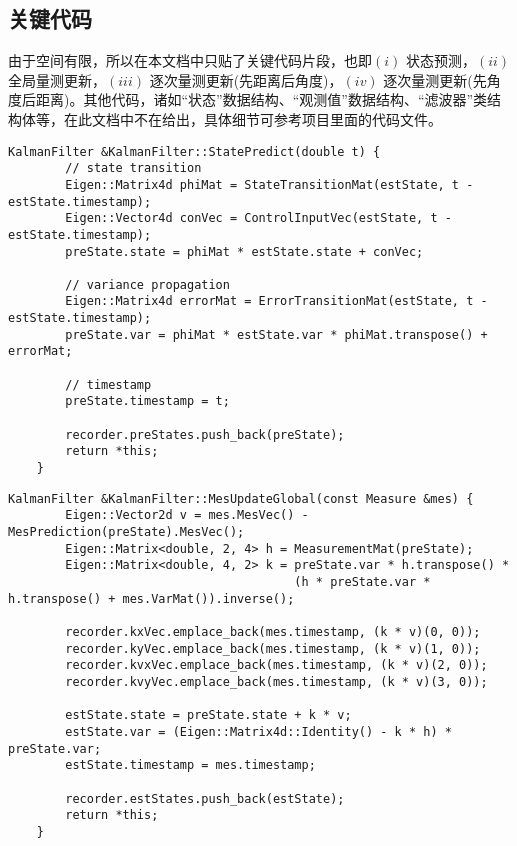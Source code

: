 \documentclass[12pt, onecolumn]{article}
\newcommand\normf{\fangsong}
\begin{document}
	\subsection{\normf 关键代码}
	由于空间有限，所以在本文档中只贴了关键代码片段，也即$(i)$ 状态预测，$(ii)$ 全局量测更新，$(iii)$ 逐次量测更新(先距离后角度)，$(iv)$ 逐次量测更新(先角度后距离)。其他代码，诸如“状态”数据结构、“观测值”数据结构、“滤波器”类结构体等，在此文档中不在给出，具体细节可参考项目里面的代码文件。
	\begin{lstlisting}[caption={\normf “状态预测”算法实现}]
    KalmanFilter &KalmanFilter::StatePredict(double t) {
        // state transition
        Eigen::Matrix4d phiMat = StateTransitionMat(estState, t - estState.timestamp);
        Eigen::Vector4d conVec = ControlInputVec(estState, t - estState.timestamp);
        preState.state = phiMat * estState.state + conVec;

        // variance propagation
        Eigen::Matrix4d errorMat = ErrorTransitionMat(estState, t - estState.timestamp);
        preState.var = phiMat * estState.var * phiMat.transpose() + errorMat;

        // timestamp
        preState.timestamp = t;

        recorder.preStates.push_back(preState);
        return *this;
    }
	\end{lstlisting}
		
	\begin{lstlisting}[caption={\normf “全局量测更新”算法实现}]
    KalmanFilter &KalmanFilter::MesUpdateGlobal(const Measure &mes) {
        Eigen::Vector2d v = mes.MesVec() - MesPrediction(preState).MesVec();
        Eigen::Matrix<double, 2, 4> h = MeasurementMat(preState);
        Eigen::Matrix<double, 4, 2> k = preState.var * h.transpose() *
                                        (h * preState.var * h.transpose() + mes.VarMat()).inverse();

        recorder.kxVec.emplace_back(mes.timestamp, (k * v)(0, 0));
        recorder.kyVec.emplace_back(mes.timestamp, (k * v)(1, 0));
        recorder.kvxVec.emplace_back(mes.timestamp, (k * v)(2, 0));
        recorder.kvyVec.emplace_back(mes.timestamp, (k * v)(3, 0));

        estState.state = preState.state + k * v;
        estState.var = (Eigen::Matrix4d::Identity() - k * h) * preState.var;
        estState.timestamp = mes.timestamp;

        recorder.estStates.push_back(estState);
        return *this;
    }
	\end{lstlisting}
		
\end{document}
